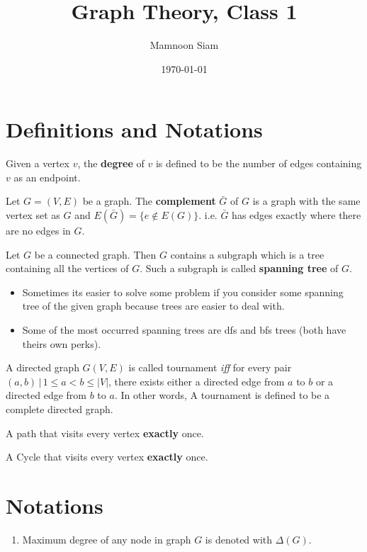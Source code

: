 \documentclass[a4paper, 10pt]{article}
\title{Graph Theory, Class 1}
\author{Mamnoon Siam}
\date{\today}
\begin{document}
  \maketitle
  \section{Definitions and Notations}
  \begin{definition}[Degree]
    Given a vertex $v$, the \textbf{degree} of $v$ is defined to be the
    number of edges containing $v$ as an endpoint.
  \end{definition}
  \begin{definition}
    Let $G=(V, E)$ be a graph. The \textbf{complement} $\bar{G}$ of $G$ is a
    graph with the same vertex set as $G$ and $E(\bar{G})=\{e \notin E(G)\}$.
    i.e. $\bar{G}$ has edges exactly where there are no edges in $G$.
  \end{definition}
  \begin{definition}
    Let $G$ be a connected graph. Then $G$ contains a subgraph which is a
    tree containing all the vertices of $G$. Such a subgraph is called
    \textbf{spanning tree} of $G$.
  \end{definition}
  \begin{itemize}
    \item Sometimes its easier to solve some problem if you consider some
      spanning tree of the given graph because trees are easier to deal with.
    \item Some of the most occurred spanning trees are dfs and bfs trees
      (both have theirs own perks).
  \end{itemize}
  \begin{definition}
    A directed graph $G(V, E)$ is called tournament \textit{iff} for every
    pair $(a,b) \, | \, 1 \le a < b \le |V|$, there exists either a directed
    edge from $a$ to $b$ or a directed edge from $b$ to $a$. In other words,
    A tournament is defined to be a complete directed graph.
  \end{definition}
  \begin{definition}
    A path that visits every vertex \textbf{exactly} once.
  \end{definition}
  \begin{definition}
    A Cycle that visits every vertex \textbf{exactly} once.
  \end{definition}
  \section{Notations}
  \begin{enumerate}
    \item Maximum degree of any node in graph $G$ is denoted with $\Delta(G)$.
  \end{enumerate}
\end{document}
